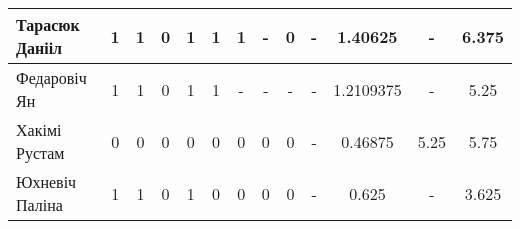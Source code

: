 \documentclass[12pt, a4paper]{extarticle}
\begin{document}
\begin{table}[H]
\begin{minipage}{\textwidth}
\begin{tabular}{|l|c|c|c|c|c|c|c|c|c|c|c|c|}
			Тарасюк Данііл      &   1  & 1 & 0 &  1    &  1   & 1 & - &  0   & - & 1.40625 &  -   &  6.375 \\ \hline
			Федаровіч Ян        &  1   & 1 & 0 &   1   &  1   & - &  -   &  -   &   -   & 1.2109375 &  -   &   5.25    \\ \hline
			Хакімі Рустам       &  0   & 0 & 0 &  0 & 0 & 0 & 0    &  0   &   -   & 0.46875 &  5.25   &  5.75    \\ \hline
			Юхневіч Паліна      &  1   & 1 & 0 &  1    & 0 & 0 & 0 & 0 &  -    & 0.625 &  -  &  3.625  \\ \hline
		\end{tabular}
	\end{minipage}
\end{table}
\end{document}
